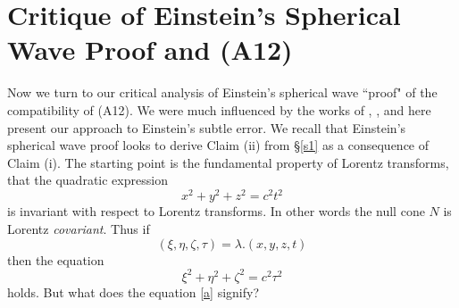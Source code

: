 \documentclass[12pt]{article}
\newcommand{\bR}{\mathbb{R}}
\begin{document}








\section{Critique of Einstein's Spherical Wave Proof and (A12)}\label{einsteinproof}
Now we turn to our critical analysis of Einstein's spherical wave ``proof" of the compatibility of (A12). We were much influenced by the works of \cite{bryant}, \cite{crothers}, and here present our approach to Einstein's subtle error. We recall that Einstein's spherical wave proof looks to derive Claim (ii) from \S \ref{s1} as a consequence of Claim (i). The starting point is the fundamental property of Lorentz transforms, that the quadratic expression $$x^2+y^2+z^2=c^2t^2$$ is invariant with respect to Lorentz transforms. In other words the null cone $N$ is Lorentz \emph{covariant}. Thus if $$(\xi, \eta, \zeta, \tau)=\lambda.(x,y,z,t)$$ then the equation \begin{equation}\xi^2+\eta^2+\zeta^2=c^2 \tau^2
\label{a} \end{equation} holds. But what does the equation \eqref{a} signify?
\end{document}
